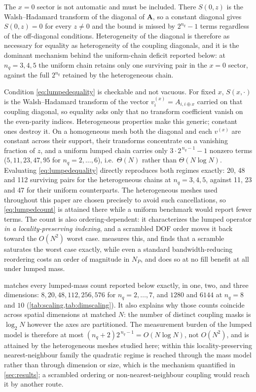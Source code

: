 \documentclass{ieeeaccess}
\newcommand{\A}{\mathbf{A}}
\begin{document}
The $x=0$ sector is not automatic and must be included. There $S(0,z)$ is the Walsh--Hadamard
transform of the diagonal of $\A$, so a constant diagonal gives $S(0,z)=0$ for every $z\neq0$ and the
bound is missed by $2^{n_q}-1$ terms regardless of the off-diagonal conditions. Heterogeneity of the
diagonal is therefore as necessary for equality as heterogeneity of the coupling diagonals, and it is
the dominant mechanism behind the uniform-chain deficit reported below: at $n_q=3,4,5$ the uniform
chain retains only one surviving pair in the $x=0$ sector, against the full $2^{n_q}$ retained by the
heterogeneous chain.

Condition \cref{eq:lumpedequality} is checkable and not vacuous. For fixed $x$, $S(x,\cdot)$ is the Walsh--Hadamard transform of the vector $v^{(x)}_i=A_{i,i\oplus x}$ carried on that coupling diagonal, so equality asks only that no transform coefficient vanish on the even-parity indices. Heterogeneous properties make this generic; constant ones destroy it. On a homogeneous mesh both the diagonal and each $v^{(x)}$ are constant across their support, their transforms concentrate on a vanishing fraction of $z$, and a uniform lumped chain carries only $3\cdot2^{\,n_q-1}-1$ nonzero terms ($5,11,23,47,95$ for $n_q=2,\ldots,6$), i.e.\ $\Theta(N)$ rather than $\Theta(N\log N)$. Evaluating \cref{eq:lumpedequality} directly reproduces both regimes exactly: 20, 48 and 112 surviving pairs for the heterogeneous chains at $n_q=3,4,5$, against 11, 23 and 47 for their uniform counterparts. The heterogeneous meshes used throughout this paper are chosen precisely to avoid such cancellations, so \cref{eq:lumpedcount} is attained there while a uniform benchmark would report fewer terms. The count is also ordering-dependent: it characterizes the lumped operator \emph{in a locality-preserving indexing}, and a scrambled DOF order moves it back toward the $O(N^2)$ worst case.  measures this, and finds that a scramble saturates the worst case exactly, while even a standard bandwidth-reducing reordering costs an order of magnitude in $N_P$, and does so at no fill benefit at all under lumped mass.

 matches every lumped-mass count reported below exactly, in one, two, and three dimensions: $8,20,48,112,256,576$ for $n_q=2,\ldots,7$, and $1280$ and $6144$ at $n_q=8$ and $10$ (\cref{tab:scaling,tab:dimscaling}). It also explains why those counts coincide across spatial dimensions at matched $N$: the number of distinct coupling masks is $\log_2 N$ however the axes are partitioned. The measurement burden of the lumped model is therefore at most $(n_q+2)2^{\,n_q-1}=O(N\log N)$, not $O(N^2)$, and is attained by the heterogeneous meshes studied here; within this locality-preserving nearest-neighbour family the quadratic regime is reached through the mass model rather than through dimension or size, which is the mechanism quantified in \cref{sec:results}; a scrambled ordering or non-nearest-neighbour coupling would reach it by another route.
\end{document}
